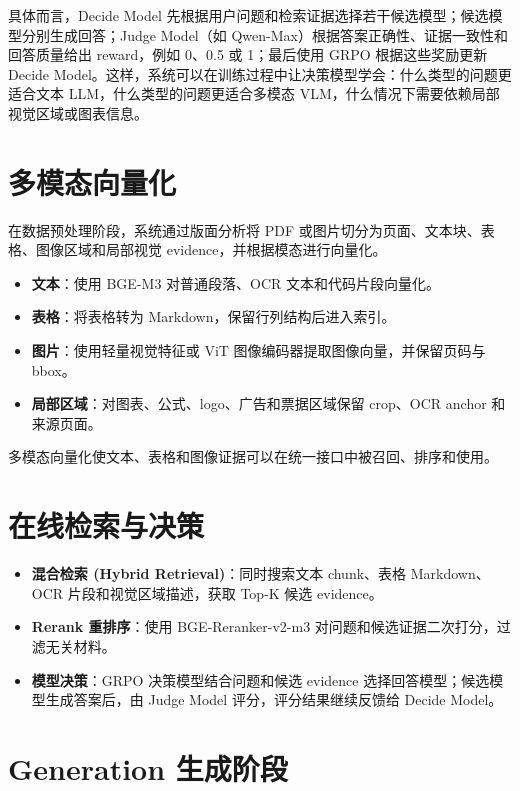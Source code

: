 具体而言，Decide Model 先根据用户问题和检索证据选择若干候选模型；候选模型分别生成回答；Judge Model（如 Qwen-Max）根据答案正确性、证据一致性和回答质量给出 reward，例如 0、0.5 或 1；最后使用 GRPO 根据这些奖励更新 Decide Model。这样，系统可以在训练过程中让决策模型学会：什么类型的问题更适合文本 LLM，什么类型的问题更适合多模态 VLM，什么情况下需要依赖局部视觉区域或图表信息。

\section{多模态向量化}

在数据预处理阶段，系统通过版面分析将 PDF 或图片切分为页面、文本块、表格、图像区域和局部视觉 evidence，并根据模态进行向量化。

\begin{itemize}
  \item \textbf{文本}：使用 BGE-M3 对普通段落、OCR 文本和代码片段向量化。
  \item \textbf{表格}：将表格转为 Markdown，保留行列结构后进入索引。
  \item \textbf{图片}：使用轻量视觉特征或 ViT 图像编码器提取图像向量，并保留页码与 bbox。
  \item \textbf{局部区域}：对图表、公式、logo、广告和票据区域保留 crop、OCR anchor 和来源页面。
\end{itemize}

多模态向量化使文本、表格和图像证据可以在统一接口中被召回、排序和使用。

\section{在线检索与决策}

\begin{itemize}
  \item \textbf{混合检索 (Hybrid Retrieval)}：同时搜索文本 chunk、表格 Markdown、OCR 片段和视觉区域描述，获取 Top-K 候选 evidence。
  \item \textbf{Rerank 重排序}：使用 BGE-Reranker-v2-m3 对问题和候选证据二次打分，过滤无关材料。
  \item \textbf{模型决策}：GRPO 决策模型结合问题和候选 evidence 选择回答模型；候选模型生成答案后，由 Judge Model 评分，评分结果继续反馈给 Decide Model。
\end{itemize}

\section{Generation 生成阶段}

